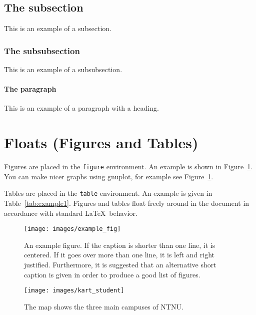 \subsection{The subsection}

This is an example of a subsection.

\subsubsection{The subsubsection}

This is an example of a subsubsection.

\paragraph{The paragraph}

This is an example of a paragraph with a heading.

\section{Floats (Figures and Tables)}
\label{sec:floats}

Figures are placed in the \texttt{figure} environment. An example is
shown in Figure~\ref{fig:examplegnuplot}. %
You can make nicer graphs using gnuplot, for example see Figure~\ref{fig:examplegnuplot}.

Tables are placed in the \texttt{table} environment. An example is given in
Table~\ref{tab:example1}. Figures and tables float freely around in the
document in accordance with standard \LaTeX\ behavior.

\begin{figure}[htbp]  %
  \centering
  \texttt{[image: images/example\_fig]}
  \caption[An example figure.]{An example figure. If the caption is
    shorter than one line, it is centered. If it goes over more than
    one line, it is left and right justified. Furthermore, it is
    suggested that an alternative short caption is given in order to
    produce a good list of figures.}
  \label{fig:examplegnuplot}
\end{figure}

\begin{figure}[htbp]  %
  \centering
  \texttt{[image: images/kart\_student]}
  \caption[Map of NTNU Campuses]{The map shows the three main campuses of NTNU.}
  \label{fig:mapNTNU}
\end{figure}


